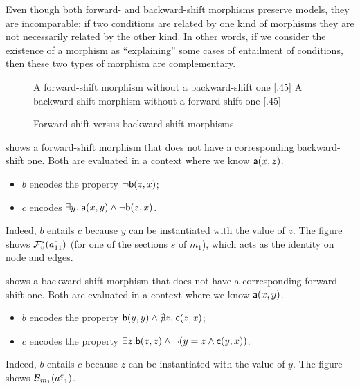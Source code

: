 \medskip\noindent
Even though both forward- and backward-shift morphisms preserve models, they are incomparable: if two conditions are related by one kind of morphisms they are not necessarily related by the other kind. In other words, if we consider the existence of a morphism as ``explaining'' some cases of entailment of conditions, then these two types of morphism are complementary.
%
\begin{figure}
\centering
\subcaptionbox
  {A forward-shift morphism without a backward-shift one
  }
  [.45\textwidth]
  {}
  \qquad
\subcaptionbox
  {A backward-shift morphism without a forward-shift one
  }
  [.45\textwidth]
  {}
\caption{Forward-shift versus backward-shift morphisms}
\end{figure}
%
\begin{example}
 shows a forward-shift morphism that does not have a corresponding backward-shift one. Both are evaluated in a context where we know $\mathsf{a}(x,z)$.
\begin{itemize}
\item $b$ encodes the property $\neg \mathsf{b}(z,x)$;
\item $c$ encodes $\exists y.\; \mathsf{a}(x,y) \wedge \neg \mathsf{b}(z,x)$.
\end{itemize}
Indeed, $b$ entails $c$ because $y$ can be instantiated with the value of $z$. The figure shows $\mathcal{F}_v^s(a^c_{11})$ (for one of the sections $s$ of $m_1$), which acts as the identity on node and edges.

 shows a backward-shift morphism that does not have a corresponding forward-shift one. Both are evaluated in a context where we know $\mathsf{a}(x,y)$.
\begin{itemize}
\item $b$ encodes the property $\mathsf{b}(y,y) \wedge \nexists z.\; \mathsf{c}(z,x)$;
\item $c$ encodes the property $\exists z.\mathsf{b}(z,z) \wedge \neg(y=z \wedge \mathsf{c}(y,x))$.
\end{itemize}
Indeed, $b$ entails $c$ because $z$ can be instantiated with the value of $y$. The figure shows $\mathcal{B}_{m_1}(a^c_{11})$.
\end{example}
%
